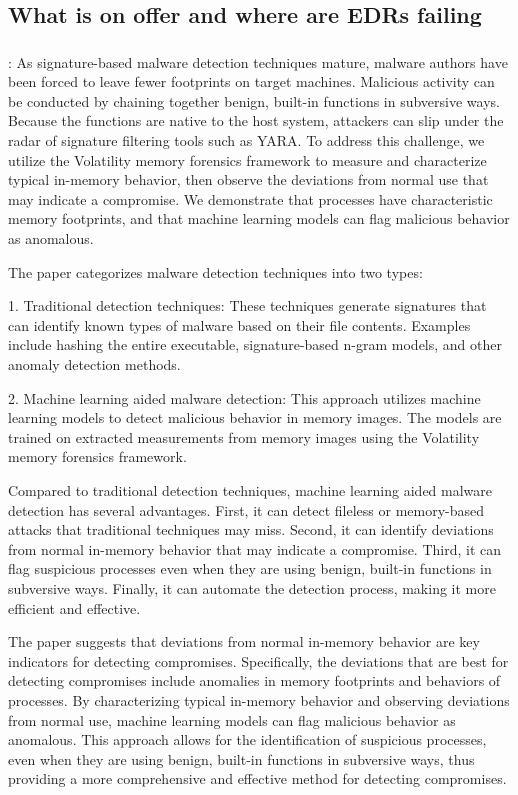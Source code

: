 \documentclass{article}
\begin{document}
\subsection{What is on offer and where are EDRs failing}

\subsubsection{\textcite{Lyles:2022}}
\textbf{}: As signature-based malware detection techniques mature, malware authors have been forced to leave fewer footprints on target machines. Malicious activity can be conducted by chaining together benign, built-in functions in subversive ways. Because the functions are native to the host system, attackers can slip under the radar of signature filtering tools such as YARA. To address this challenge, we utilize the Volatility memory forensics framework to measure and characterize typical in-memory behavior, then observe the deviations from normal use that may indicate a compromise. We demonstrate that processes have characteristic memory footprints, and that machine learning models can flag malicious behavior as anomalous.

The paper categorizes malware detection techniques into two types: 

1. Traditional detection techniques: These techniques generate signatures that can identify known types of malware based on their file contents. Examples include hashing the entire executable, signature-based n-gram models, and other anomaly detection methods.

2. Machine learning aided malware detection: This approach utilizes machine learning models to detect malicious behavior in memory images. The models are trained on extracted measurements from memory images using the Volatility memory forensics framework.

Compared to traditional detection techniques, machine learning aided malware detection has several advantages. First, it can detect fileless or memory-based attacks that traditional techniques may miss. Second, it can identify deviations from normal in-memory behavior that may indicate a compromise. Third, it can flag suspicious processes even when they are using benign, built-in functions in subversive ways. Finally, it can automate the detection process, making it more efficient and effective.

The paper suggests that deviations from normal in-memory behavior are key indicators for detecting compromises. Specifically, the deviations that are best for detecting compromises include anomalies in memory footprints and behaviors of processes. By characterizing typical in-memory behavior and observing deviations from normal use, machine learning models can flag malicious behavior as anomalous. This approach allows for the identification of suspicious processes, even when they are using benign, built-in functions in subversive ways, thus providing a more comprehensive and effective method for detecting compromises.
\end{document}
